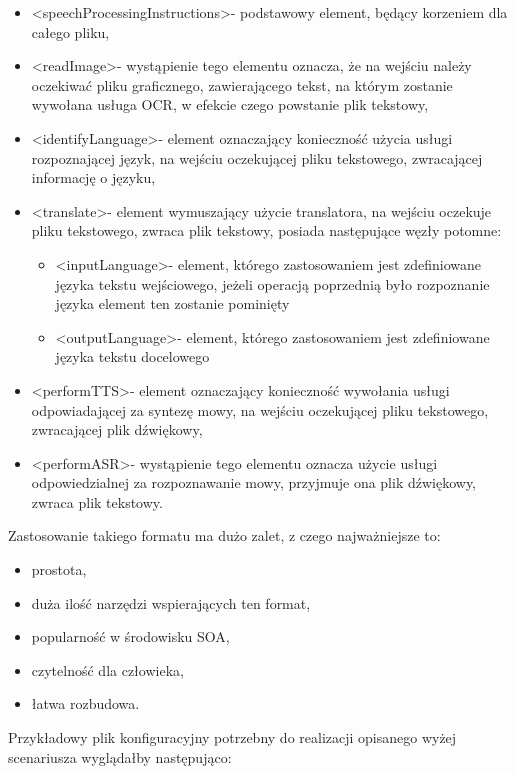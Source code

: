  \begin{itemize}
	\item \textless speechProcessingInstructions\textgreater - podstawowy element, będący korzeniem dla całego pliku,
	\item \textless readImage\textgreater - wystąpienie tego elementu oznacza, że na wejściu należy oczekiwać pliku graficznego, zawierającego tekst, na którym zostanie wywołana usługa OCR, w efekcie czego powstanie plik tekstowy,
	\item \textless identifyLanguage\textgreater - element oznaczający konieczność użycia usługi rozpoznającej język, na wejściu oczekującej pliku tekstowego, zwracającej informację o języku,
	\item \textless translate\textgreater - element wymuszający użycie translatora, na wejściu oczekuje pliku tekstowego, zwraca plik tekstowy, posiada następujące węzły potomne:
		 \begin{itemize}
			\item \textless inputLanguage\textgreater - element, którego zastosowaniem jest zdefiniowane języka tekstu wejściowego, jeżeli operacją poprzednią  było rozpoznanie języka element ten zostanie pominięty
			\item \textless outputLanguage\textgreater - element, którego zastosowaniem jest zdefiniowane języka tekstu docelowego
		\end{itemize}
	\item \textless performTTS\textgreater - element oznaczający konieczność wywołania usługi odpowiadającej za syntezę mowy, na wejściu oczekującej pliku tekstowego, zwracającej plik dźwiękowy,
	\item \textless performASR\textgreater - wystąpienie tego elementu oznacza użycie usługi odpowiedzialnej  za rozpoznawanie mowy, przyjmuje ona plik dźwiękowy, zwraca plik tekstowy.
\end{itemize}
Zastosowanie takiego formatu ma dużo zalet, z czego najważniejsze to:
\begin{itemize}
	\item prostota,
	\item duża ilość narzędzi wspierających ten format,
	\item popularność w środowisku SOA,
	\item czytelność dla człowieka,
	\item łatwa rozbudowa.
\end{itemize}
\newpage
Przykładowy plik konfiguracyjny potrzebny do realizacji opisanego wyżej scenariusza wyglądałby następująco:

